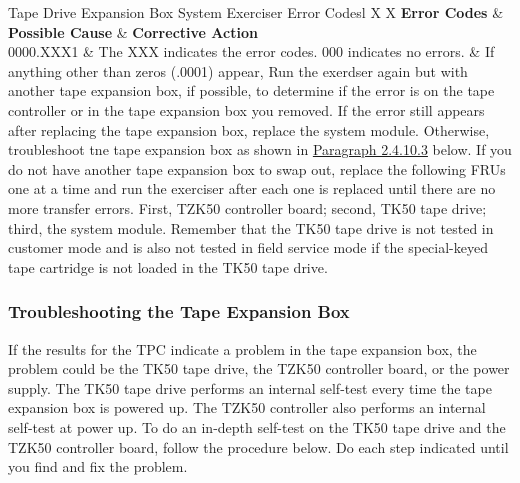 \begin{tblcont}{Tape Drive Expansion Box System Exerciser Error Codes}{l X X}
\textbf{Error Codes} & \textbf{Possible Cause} & \textbf{Corrective Action}\\
\hline
0000.XXX1	&	The XXX indicates the error codes. 000 indicates no errors. &
	If anything other than zeros (.0001) appear, Run the exerdser again but with another tape expansion
	box, if possible, to determine if the error is on the tape controller or in the tape expansion box you
	removed. If the error still appears after replacing the tape expansion box, replace the system module.
	Otherwise, troubleshoot tne tape expansion box as shown in \hyperlink{subsubsection.2.4.10.3}{Paragraph 2.4.10.3}
	below. If you do not have another tape expansion box to swap out, replace the following FRUs one at a time and run the
	exerciser after each one is replaced until there are no more transfer errors.  First, TZK50 controller
	board; second, TK50 tape drive; third, the system module. Remember that the TK50 tape drive is not
	tested in customer mode and is also not tested in field service mode if the special-keyed tape cartridge
	is not loaded in the TK50 tape drive.
\\
\end{tblcont}

\subsubsection{Troubleshooting the Tape Expansion Box}

If the results for the TPC indicate a problem in the tape expansion box, the
problem could be the TK50 tape drive, the TZK50 controller board, or the
power supply. The TK50 tape drive performs an internal self-test every time
the tape expansion box is powered up. The TZK50 controller also performs
an internal self-test at power up. To do an in-depth self-test on the TK50
tape drive and the TZK50 controller board, follow the procedure below. Do
each step indicated until you find and fix the problem.

